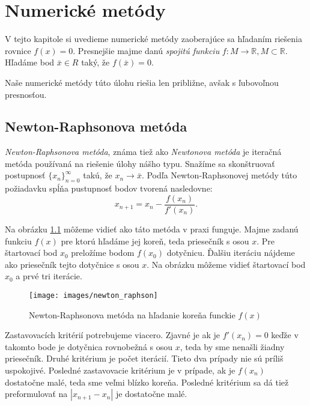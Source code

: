 
\chapter{Numerické metódy}
\label{kap:numeric_methods}

V tejto kapitole si uvedieme numerické metódy zaoberajúce sa hľadaním riešenia rovnice $f(x) = 0$.
Presnejšie majme danú \textit{spojitú funkciu} $f: M \to \mathbb{R}, M \subset \mathbb{R}$. Hľadáme bod
$\bar{x} \in R$ taký, že $f(\bar{x}) = 0$.

Naše numerické metódy túto úlohu riešia len približne, avšak s ľubovoľnou presnosťou.

\section{Newton-Raphsonova metóda}

\textit{Newton-Raphsonova metóda}, známa tiež ako \textit{Newtonova metóda} je iteračná metóda používaná na riešenie
úlohy nášho typu. Snažíme sa skonštruovať postupnosť $\{x_n\}_{n=0}^\infty$ takú, že $x_n \to \bar{x}$.
Podľa Newton-Raphsonovej metódy túto požiadavku spĺňa pustupnosť bodov tvorená nasledovne: 
$$ x_{n+1} = x_n - \frac{f(x_n)}{f'(x_n)}.$$

Na obrázku \ref{obr:newton_raphson} môžeme vidieť ako táto metóda v praxi funguje. Majme zadanú funkciu
$f(x)$ pre ktorú hľadáme jej koreň, teda priesečník s osou $x$. Pre štartovací bod
$x_0$ preložíme bodom $f(x_0)$ dotyčnicu. Ďalšiu iteráciu nájdeme ako priesečník tejto 
dotyčnice s osou $x$. Na obrázku môžeme vidieť štartovací bod $x_0$ a prvé tri iterácie.

\begin{figure}
    \centerline{\texttt{[image: images/newton\_raphson]}}
    \caption[Newton-Raphsonova metóda na hľadanie koreňa funckie $f(x)$]{Newton-Raphsonova metóda na hľadanie koreňa funckie $f(x)$}
    \label{obr:newton_raphson}
\end{figure}

Zastavovacích kritérií potrebujeme viacero. Zjavné je ak je $f'(x_n) = 0$ keďže v takomto bode je dotyčnica rovnobežná
s osou $x$, teda by sme nenašli žiadny priesečník. Druhé kritérium je počet iterácií. Tieto 
dva prípady nie sú príliš uspokojivé. Posledné zastavovacie kritérium je v prípade, ak je $f(x_n)$ dostatočne 
malé, teda sme veľmi blízko koreňa. Posledné kritérium sa dá tiež preformulovať na $|x_{n+1} - x_n|$ 
je dostatočne malé.

